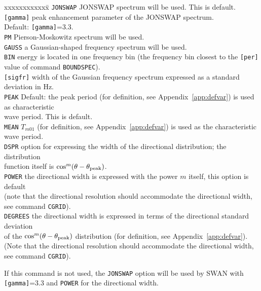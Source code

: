 \documentclass[12pt]{book}
\begin{document}
\begin{tabbing}
xxxxxxxxxxxx\= \kill
{\tt JONSWAP}  \> JONSWAP spectrum will be used. This is default.\\
{\tt [gamma]}  \> peak enhancement parameter of the JONSWAP spectrum.\+\\
                  Default: {\tt [gamma]}=3.3.\-\\
{\tt PM}       \> Pierson-Moskowitz spectrum will be used.\\
{\tt GAUSS}    \> a Gaussian-shaped frequency spectrum will be used.\\
{\tt BIN}      \> energy is located in one frequency bin (the frequency bin closest to the {\tt [per]}\+\\
                  value of command {\tt BOUNDSPEC}).\-\\
{\tt [sigfr]}  \> width of the Gaussian frequency spectrum expressed as a standard deviation in Hz.\\
{\tt PEAK}     \> Default: the peak period (for definition, see Appendix~\ref{app:defvar}) is used as characteristic\+\\
                  wave period. This is default.\-\\
{\tt MEAN}     \> $T_{m01}$ (for definition, see Appendix~\ref{app:defvar}) is used as the characteristic wave period.\\
{\tt DSPR}     \> option for expressing the width of the directional distribution; the distribution\+\\
                  function itself is $\cos^m(\theta-\theta_{\rm peak})$.\-\\
{\tt POWER}    \> the directional width is expressed with the power $m$ itself, this option is default\+\\
                  (note that the directional resolution should accommodate the directional width,\\
                  see command {\tt CGRID}).\-\\
{\tt DEGREES}  \> the directional width is expressed in terms of the directional standard deviation\+\\
                  of the $\cos^m(\theta-\theta_{\rm peak})$ distribution (for definition, see Appendix~\ref{app:defvar}).\\
                  (Note that the directional resolution should accommodate the directional width,\\
                  see command {\tt CGRID}).\-\\
\end{tabbing}
If this command is not used, the {\tt JONSWAP} option will be used by SWAN with {\tt [gamma]}=3.3 and {\tt POWER} for the directional width.
\end{document}
